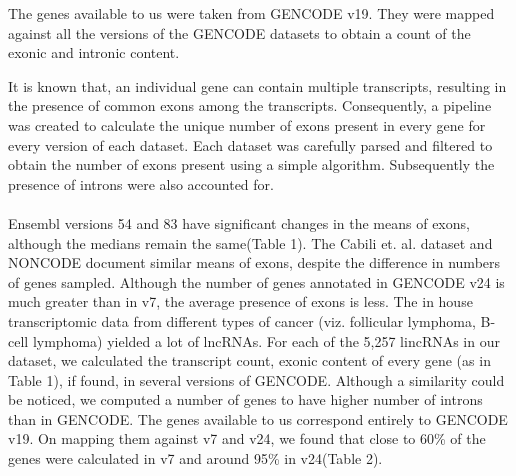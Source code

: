 \documentclass[ncrna,article,submit,moreauthors,pdftex,10pt,a4paper]{mdpi}
\begin{document}
 
 
 
 
 The genes available to us were taken from GENCODE v19.
 They were mapped against all the versions of the GENCODE datasets to obtain a count of the exonic and intronic content. 
\endgroup
\begingroup\color{green} 



It is known that, an individual gene can contain multiple transcripts, resulting in the presence of common exons among the transcripts.
 Consequently, a pipeline was created to calculate the unique number of exons present in every gene for every version of each dataset. 
 Each dataset was carefully parsed and filtered to obtain the number of exons present using a simple algorithm. Subsequently the presence of introns were also accounted for.
 
 \paragraph{}
  Ensembl versions 54 and 83 have significant changes in the means of exons, although the medians remain the same(Table 1). The Cabili et. al. dataset and NONCODE document similar means of exons, despite the difference in numbers of genes sampled. Although the number of genes annotated in GENCODE v24 is much greater than in v7, the average presence of exons is less.
 The in house transcriptomic data from different types of cancer (viz. follicular lymphoma, B-cell lymphoma) yielded a lot of lncRNAs. 
 For each of the 5,257 lincRNAs in our dataset, we calculated the transcript count, exonic content of every gene (as in Table 1), if found, in several versions of GENCODE. Although a similarity could be noticed, we computed a number of genes to have higher number of introns than in GENCODE.
  The genes available to us correspond entirely to GENCODE v19.
\endgroup
  On mapping them against v7 and v24, we found that close to 60\% of the genes
 were calculated in v7 and around 95\% in v24(Table 2).
\end{document}
